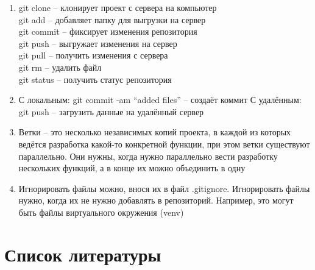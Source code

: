 \documentclass[
  12pt,
  a4paper,
  DIV=11,
  numbers=noendperiod]{scrreprt}
\begin{document}
\begin{enumerate}
  Хранение файлов проекта, а также обеспечение командной работы, и
  контроль за версиями проекта
\item
  git clone -- клонирует проект с сервера на компьютер\\
  git add -- добавляет папку для выгрузки на сервер\\
  git commit -- фиксирует изменения репозитория\\
  git push -- выгружает изменения на сервер\\
  git pull -- получить изменения с сервера\\
  git rm -- удалить файл\\
  git status -- получить статус репозитория
\item
  С локальным: git commit -am \enquote{added files} -- создаёт коммит С
  удалённым: git push -- загрузить данные на удалённый сервер
\item
  Ветки -- это несколько независимых копий проекта, в каждой из которых
  ведётся разработка какой-то конкретной функции, при этом ветки
  существуют параллельно. Они нужны, когда нужно параллельно вести
  разработку нескольких функций, а в конце их можно объединить в одну
\item
  Игнорировать файлы можно, внося их в файл .gitignore. Игнорировать
  файлы нужно, когда их не нужно добавлять в репозиторий. Например, это
  могут быть файлы виртуального окружения (venv)
\end{enumerate}

\chapter*{Список
литературы}\label{ux441ux43fux438ux441ux43eux43a-ux43bux438ux442ux435ux440ux430ux442ux443ux440ux44b}

\printbibliography[heading=none]
\end{document}
